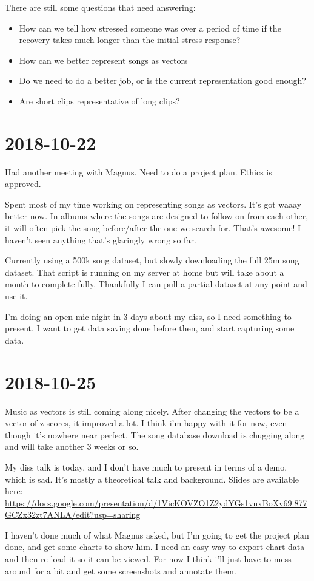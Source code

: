 \documentclass{article}
\begin{document}
	There are still some questions that need answering:

	\begin{itemize}
		\item How can we tell how stressed someone was over a period of time if the recovery takes much longer than the initial stress response?
		\item How can we better represent songs as vectors
		\item Do we need to do a better job, or is the current representation good enough?
		\item Are short clips representative of long clips?
	\end{itemize}

	\section{2018-10-22}
	Had another meeting with Magnus. Need to do a project plan. Ethics is approved.
	
	Spent most of my time working on representing songs as vectors. It's got waaay better now. In albums where the songs are designed to follow on from each other, it will often pick the song before/after the one we search for. That's awesome! I haven't seen anything that's glaringly wrong so far.
	
	Currently using a 500k song dataset, but slowly downloading the full 25m song dataset. That script is running on my server at home but will take about a month to complete fully. Thankfully I can pull a partial dataset at any point and use it.
	
	I'm doing an open mic night in 3 days about my diss, so I need something to present. I want to get data saving done before then, and start capturing some data.
	
	\section{2018-10-25}
	Music as vectors is still coming along nicely. After changing the vectors to be a vector of z-scores, it improved a lot. I think i'm happy with it for now, even though it's nowhere near perfect. The song database download is chugging along and will take another 3 weeks or so.
	
	My diss talk is today, and I don't have much to present in terms of a demo, which is sad. It's mostly a theoretical talk and background. Slides are available here: \url{https://docs.google.com/presentation/d/1VicKOVZO1Z2ydYGs1vnxBoXv69i877GCZx32zt7ANLA/edit?usp=sharing}
	
	I haven't done much of what Magnus asked, but I'm going to get the project plan done, and get some charts to show him. I need an easy way to export chart data and then re-load it so it can be viewed. For now I think i'll just have to mess around for a bit and get some screenshots and annotate them.
	
		
\end{document}
